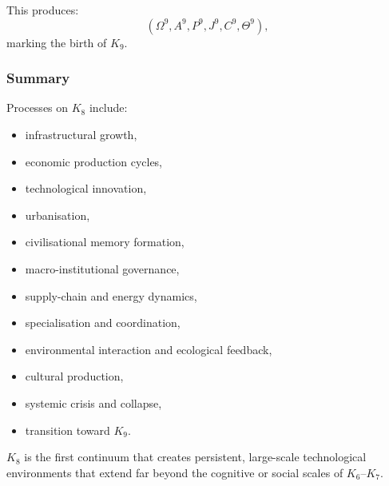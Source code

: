 This produces:
\[
(\Omega^9, A^9, P^9, J^9, C^9, \Theta^9),
\]
marking the birth of $K_9$.

\subsubsection{Summary}

Processes on $K_8$ include:
\begin{itemize}
    \item infrastructural growth,
    \item economic production cycles,
    \item technological innovation,
    \item urbanisation,
    \item civilisational memory formation,
    \item macro-institutional governance,
    \item supply-chain and energy dynamics,
    \item specialisation and coordination,
    \item environmental interaction and ecological feedback,
    \item cultural production,
    \item systemic crisis and collapse,
    \item transition toward $K_9$.
\end{itemize}

$K_8$ is the first continuum that creates persistent, large-scale 
technological environments that extend far beyond the cognitive or 
social scales of $K_6$–$K_7$.
